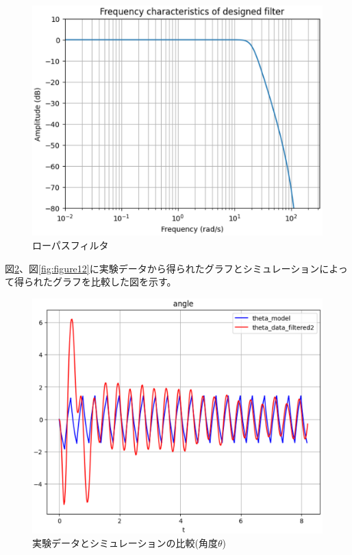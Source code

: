 \documentclass[a4paper,10.5pt]{ltjsarticle}
\begin{document}
\begin{figure}[h]
  \centering
  \includegraphics[scale=0.7]{figure10.eps}
  \caption{ローパスフィルタ}
  \label{fig:figure10}
\end{figure}
\clearpage
図\ref{fig:figure11}、図\ref{fig:figure12}に実験データから得られたグラフとシミュレーションによって得られたグラフを比較した図を示す。
\begin{figure}[h]
  \centering
  \includegraphics[scale=0.7]{figure11.eps}
  \caption{実験データとシミュレーションの比較(角度$\theta$)}
  \label{fig:figure11}
\end{figure}
\end{document}
